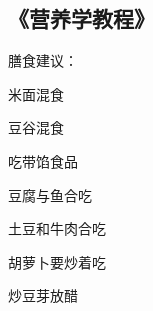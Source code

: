 \subsection{《营养学教程》}

膳食建议：
\begin{itemize*}
	\item 米面混食
	\item 豆谷混食
	\item 吃带馅食品
	\item 豆腐与鱼合吃
	\item 土豆和牛肉合吃
	\item 胡萝卜要炒着吃
	\item 炒豆芽放醋
\end{itemize*}